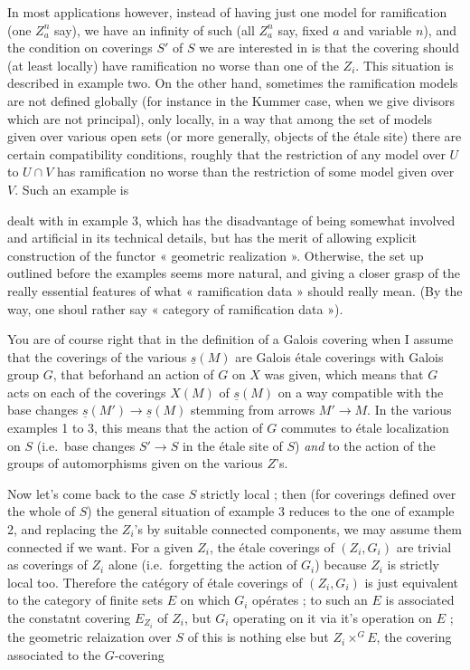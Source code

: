 \documentclass[11pt,a4paper]{article}
\begin{document}
In most applications however, instead of having just one model for ramification
(one $Z^n_a$ say), we have an infinity of such (all $Z^n_a$ say, fixed $a$ and
variable $n$), and the condition on coverings $S'$ of $S$ we are interested in
is that the covering should (at least locally) have ramification no worse than
one of the $Z_i$. This situation is described in example two. On the other
hand, sometimes the ramification models are not defined globally (for instance
in the Kummer case, when we give \struck{\ill{}} divisors which are not
principal), only locally, in a way that among the set of models given over
various open sets (or more generally, objects of the étale site) there are
certain compatibility conditions, roughly that the restriction of any model
over $U$ to $U \cap V$ has ramification no worse than the restriction of some
model given over $V$. Such an example is

dealt with in example 3, which has the disadvantage of being somewhat involved
and artificial in its technical details, but has the merit of allowing explicit
construction of the functor « geometric realization ». Otherwise, the set up
outlined before the examples seems more natural, and giving a closer grasp of
the \struck{\ill{}} really essential features of what « ramification data »
should really mean. (By the way, one shoul rather say « category of
ramification data »).

You are of course right that in the definition of a Galois covering when I
assume that the coverings of the various $\underline{s}(M)$ are Galois étale
coverings with Galois group $G$, that beforhand an action of $G$ on $X$ was
given, which means that $G$ acts on each of the coverings $X(M)$ of
$\underline{s}(M)$ on a way compatible with the base changes
$\underline{s}(M') \to \underline{s}(M)$ stemming from arrows
$M' \to M$. In the various examples 1 to 3, this means that the action of $G$
commutes to étale localization on $S$ (i.e.\ base changes $S' \to S$ in the
étale site of $S$) \emph{and} to the action of the groups of automorphisms
given on the various $Z$'s.

Now let's come back to the case $S$ strictly local ; then (for coverings
defined over the whole of $S$) the general situation of example 3 reduces to
the one of example 2, and replacing the $Z_i$'s by suitable connected
components, we may assume them connected if we want. For a given $Z_i$, the
\struck{\ill{}} étale coverings of $(Z_i, G_i)$ are trivial as coverings of
$Z_i$ alone (i.e.\ forgetting the action of $G_i$) because $Z_i$ is strictly
local too. Therefore the catégory of étale coverings of $(Z_i, G_i)$ is just
equivalent to the category of finite sets $E$ on which $G_i$ opérates ; to such
an $E$ is associated the constatnt covering $E_{Z_i}$ of $Z_i$, but $G_i$
operating on it via it's operation on $E$ ; the geometric relaization over $S$
of this is nothing else but $Z_i \times^G E$, the covering associated to the
$G$-covering
\end{document}
